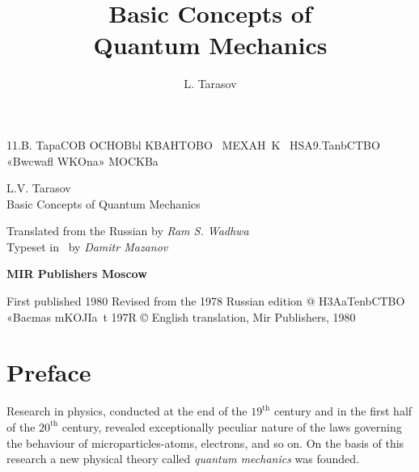 \documentclass[a4paper,sfsidenotes,colorlinks=true]{tufte-book}
\title{Basic Concepts of \\ Quantum Mechanics}
\author{L. Tarasov}
\date{}
\numberwithin{equation}{section}
\numberwithin{figure}{section}
\begin{document}
\maketitle
\frontmatter
11.B. TapaCOB
OCHOBbl
KBAHTOBO~ MEXAH~K~
HSA9.TanbCTBO «Bwcwafl WKOna» MOCKBa
\newpage
\thispagestyle{empty}
\begin{fullwidth}
\noindent

\begin{Huge}
\textsf{L.V. Tarasov\\
Basic Concepts of Quantum Mechanics}\\
\end{Huge}
\vspace{1cm}
\begin{Large}
Translated from the Russian by \emph{Ram S. Wadhwa}\\[15pt]
Typeset in \XeLaTeX  \,  by \emph{Damitr Mazanov}
\end{Large}
\vspace{6cm}
\begin{center}
\begin{Huge}
\textbf{MIR Publishers Moscow}
\end{Huge}
\end{center}
\end{fullwidth}
\cleardoublepage
First published 1980 Revised from the 1978 Russian edition
@ H3AaTenbCTBO «Bacmas mKOJIa~t 197R © English translation, Mir Publishers, 1980
\setcounter{tocdepth}{3}
\tableofcontents


\chapter*{Preface}
{}

Research in physics, conducted at the end of the $19^{\text{th}}$ century and in the first half of the $20^{\text{th}}$ century, revealed exceptionally peculiar nature of the laws governing the behaviour of microparticles-atoms, electrons, and so on. On the basis of this research a new physical theory called \emph{quantum mechanics} was founded. 
\end{document}

